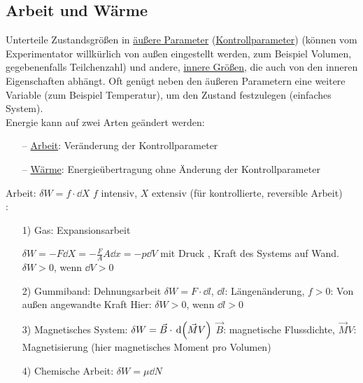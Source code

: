 \subsection{Arbeit und Wärme}
Unterteile Zustandsgrößen in \uline{äußere Parameter} (\uline{Kontrollparameter}) (können vom Experimentator will\-kür\-lich von außen eingestellt werden, zum Beispiel Volumen, gegebenenfalls Teilchenzahl) und andere, \uline{innere Größen}, die auch von den inneren Eigenschaften abhängt. Oft genügt neben den äußeren Parametern eine weitere Variable (zum Beispiel Temperatur), um den Zustand festzulegen (\glqq einfaches System\grqq).\\
Energie kann auf zwei Arten geändert werden:
\begin{itemize}[align=left, labelwidth=, labelsep=1ex, labelindent=0pt, leftmargin=++]
  \item[-- \uline{Arbeit}:] Veränderung der Kontrollparameter
  \item[-- \uline{Wärme}:] Energieübertragung ohne Änderung der Kontrollparameter
\end{itemize}
Arbeit: $\delta W = f\cdot \dd{X}$ $f$ intensiv, $X$ extensiv (für kontrollierte, reversible Arbeit)\\
:
\begin{itemize}[align=left, labelwidth=, labelsep=1ex, labelindent=0pt, leftmargin=++]
  \item[1)]  Gas: Expansionsarbeit $\delta W = - F \dd{X} = -\frac{F}{A} A \dd{x} = - p \dd{V}$ mit Druck , Kraft  des Systems auf Wand. $\delta W > 0$, wenn $\dd{V} > 0$
  \item[2)] Gummiband: Dehnungsarbeit $\delta W = F\cdot\dd{l}$, $\dd{l}$: Längenänderung, $f>0$: Von außen angewandte Kraft Hier: $\delta W >0$, wenn $\dd{l}>0$
  \item[3)] Magnetisches System: $\delta W = \vec{B}\cdot\,\text d{\left( \vec{M}V \right)}$ $\vec{B}$: magnetische Flussdichte, $\vec{M}V$: Magnetisierung (hier magnetisches Moment pro Volumen)
  \item[4)] Chemische Arbeit: $\delta W = \mu \dd{N}$
\end{itemize}
